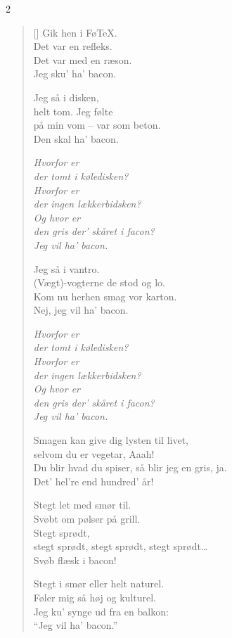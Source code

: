 \begin{multicols}2
\settowidth{\versewidth}{Du blir hvad du spiser, så blir jeg en gris, ja.}
\begin{verse}[\versewidth]
Gik hen i Fø\TeX.\\
Det var en refleks.\\
Det var med en ræson.\\
Jeg sku’ ha’ bacon.

Jeg så i disken,\\
helt tom. Jeg følte\\
på min vom – var som beton.\\
Den skal ha’ bacon.

\emph{Hvorfor er\\
der tomt i køledisken?\\
Hvorfor er\\
der ingen lækkerbidsken?\\
Og hvor er\\
den gris der’ skåret i facon?\\
Jeg vil ha’ bacon.}

Jeg så i vantro.\\
(Vægt)-vogterne de stod og lo.\\
Kom nu herhen smag vor karton.\\
Nej, jeg vil ha’ bacon.

\emph{Hvorfor er\\
der tomt i køledisken?\\
Hvorfor er\\
der ingen lækkerbidsken?\\
Og hvor er\\
den gris der’ skåret i facon?\\
Jeg vil ha’ bacon.}
\columnbreak

Smagen kan give dig lysten til livet,\\
selvom du er vegetar, Aaah!\\
Du blir hvad du spiser, så blir jeg en gris, ja.\\
Det’ hel’re end hundred’ år!

Stegt let med smør til.\\
Svøbt om pølser på grill.\\
Stegt sprødt,\\
stegt sprødt, stegt sprødt, stegt sprødt\ldots\\
Svøb flæsk i bacon!

Stegt i smør eller helt naturel.\\
Føler mig så høj og kulturel.\\
Jeg ku’ synge ud fra en balkon:\\
``Jeg vil ha’ bacon.''


\end{verse}
\end{multicols}
